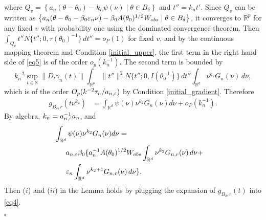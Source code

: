 	where $Q_{v}=\left\{ a_{n}(\theta-\theta_{0})-k_{n}\psi(\nu)\mid\theta\in B_{\delta}\right\} $
	and $t''=k_{n}t'$. 
	Since $Q_{v}$ can be written as $\left\{ a_{n}(\theta-\theta_{0}-\beta_{0}\varepsilon_{n}\nu)-\beta_{0}A(\theta_{0})^{1/2}W_{\relax obs}\mid\theta\in B_{\delta}\right\} $,
	it converges to $\mathbb{R}^{p}$ for any fixed $v$ with probability one using the dominated convergence theorem. %
	Then $\int_{Q_{v}}t''N\{t'';0,\tau(\theta_{0})^{-1}\}\,dt''=o_{P}(1)$
	for fixed $v$, and by the continuous mapping theorem and Condition \ref{initial_upper}, the
	first term in the right hand side of \eqref{eq5} is of the order
	$o_{p}(k_{n}^{-1})$. The second term is bounded by 
	\[
	k_{n}^{-2}\sup_{t\in\mathbb{R}}\|D_{t}\gamma_{n}(t)\|\int_{\mathbb{R}^{p}}\|t''\|^{2}N\{t'';0,I(\theta_{0}^{-1})\}\,dt''\int_{\mathbb{R}^{d}}\nu^{k_{2}}G_{n}(\nu)\,d\nu,
	\]
	which is of the order $O_{p}(k^{-2}\tau_{n}/a_{n,\varepsilon})$ by Condition \ref{initial_gradient}.
	Therefore 
	\begin{align}
	g_{B_{\delta},r}(t\nu^{k_{2}}) & =\int_{\mathbb{R}^{d}}\psi(\nu)\nu^{k_{2}}G_{n}(\nu)d\nu+o_{P}(k_{n}^{-1}).\label{eq6}
	\end{align}
	By algebra, $k_{n}=a_{n,\varepsilon}^{-1}a_{n}$, and 
	\begin{eqnarray}
	\int_{\mathbb{R}^{d}}\psi(\nu)\nu^{k_{2}}G_{n}(\nu)d\nu = \nonumber \\
	&\hspace{-3cm}a_{n,\veps}\beta_{0}\{a_{n}^{-1}A(\theta_{0})^{1/2}W_{\rm obs}\int_{\mathbb{R}^{d}}\nu^{k_{2}}G_{n,r}(\nu)\,d\nu+ \nonumber \\
	&\hspace{-3cm}\veps_{n}\int_{\mathbb{R}^{d}}\nu^{k_{2}+1}G_{n,r}(\nu)\,d\nu\}.\label{eq7}
	\end{eqnarray}
	Then ($i$) and ($ii$) in the Lemma holds by plugging the expansion
	of $g_{B_{\delta},r}(t)$ into \eqref{eq4}.
	
	\hfill{$\square$} 
	

